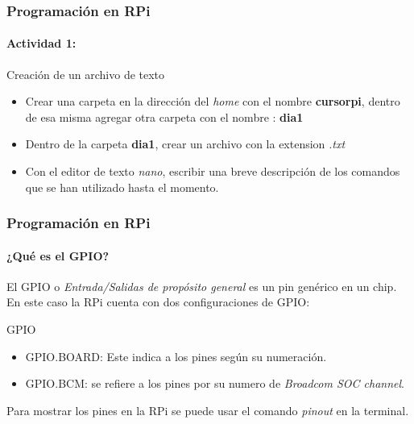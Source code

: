 \documentclass{beamer}
\begin{document}
	\begin{frame}
		\frametitle{Programación en RPi}
		\framesubtitle{Actividad 1:}
		\begin{mybox}{Creación de un archivo de texto}
			\begin{itemize}
				\item Crear una carpeta en la dirección del \textit{home} con el nombre \textbf{cursorpi}, dentro de esa misma agregar otra carpeta con el nombre : \textbf{dia1}
				\item Dentro de la carpeta \textbf{dia1}, crear un archivo con la extension \textit{.txt}
				\item Con el editor de texto \textit{nano}, escribir una breve descripción de los comandos que se han utilizado hasta el momento.
			\end{itemize}
			
		\end{mybox}
	\end{frame}
	\begin{frame}
		\frametitle{Programación en RPi}
		\framesubtitle{¿Qué es el GPIO?}
		El GPIO o \textit{Entrada/Salidas de propósito general} es un pin genérico en un chip. En este caso la RPi cuenta con dos configuraciones de GPIO:
		\begin{mybox}{GPIO}
			\begin{itemize}
				\item GPIO.BOARD: Este indica a los pines según su numeración.
				\item GPIO.BCM: se refiere a los pines por su numero de \textit{Broadcom SOC channel}.
			\end{itemize}
		\end{mybox}
		Para mostrar los pines en la RPi se puede usar el comando \textit{pinout} en la terminal.
	\end{frame}
\end{document}
